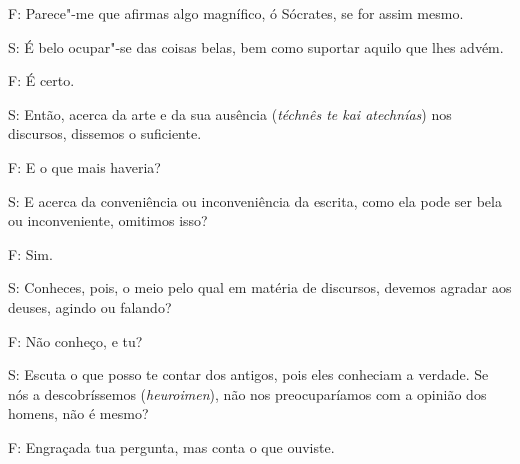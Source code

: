 F: Parece"-me que afirmas algo magnífico, ó Sócrates, se for assim mesmo.
 

S: É belo ocupar"-se das coisas belas, bem como suportar aquilo que lhes
advém.

 

F: É certo.

 

\bekker{[274b]} S: Então, acerca da arte e da sua ausência (\emph{téchnês te
kai atechnías}) nos discursos, dissemos o suficiente.

 

F: E o que mais haveria?

 

S: E acerca da conveniência ou inconveniência da escrita, como ela pode
ser bela ou inconveniente, omitimos isso?

 

F: Sim.

 

S: Conheces, pois, o meio pelo qual em matéria de discursos, devemos
agradar aos deuses, agindo ou falando?

 

F: Não conheço, e tu?

 

\bekker{[274c]} S: Escuta o que posso te contar dos antigos, pois eles
conheciam a verdade. Se nós a descobríssemos (\emph{heuroimen}), não nos
preocuparíamos com a opinião dos homens, não é mesmo?

 

F: Engraçada tua pergunta, mas conta o que ouviste.

 

